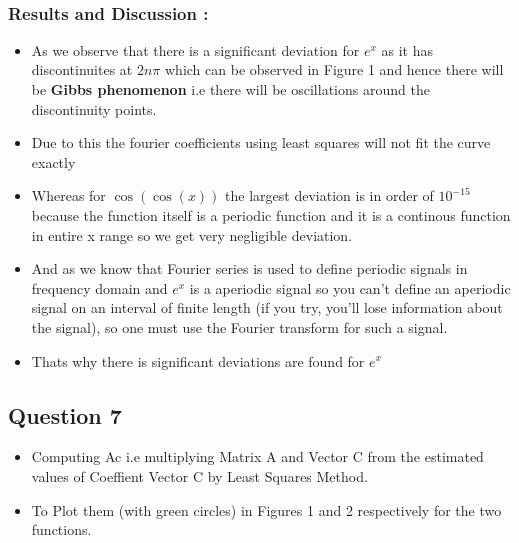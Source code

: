 \documentclass[a4paper]{article}
\providecommand{\tightlist}{%
      \setlength{\itemsep}{0pt}\setlength{\parskip}{0pt}}
\begin{document}
    \begin{center}
    \end{center}
    { \hspace*{\fill} \\}
    
    \subsubsection{Results and Discussion :}\label{results-and-discussion}

\begin{itemize}
\tightlist
\item
  As we observe that there is a significant deviation for \(e^{x}\) as
  it has discontinuites at \(2n\pi\) which can be observed in Figure 1
  and hence there will be \textbf{Gibbs phenomenon} i.e there will be
  oscillations around the discontinuity points.
\item
  Due to this the fourier coefficients using least squares will not fit
  the curve exactly
\item
  Whereas for \(\cos(\cos(x))\) the largest deviation is in order of
  \(10^{-15}\) because the function itself is a periodic function and it
  is a continous function in entire x range so we get very negligible
  deviation.
\item
  And as we know that Fourier series is used to define periodic signals
  in frequency domain and \(e^{x}\) is a aperiodic signal so you can't
  define an aperiodic signal on an interval of finite length (if you
  try, you'll lose information about the signal), so one must use the
  Fourier transform for such a signal.
\item
  Thats why there is significant deviations are found for \(e^{x}\)
\end{itemize}

    \subsection{Question 7}\label{question-7}

\begin{itemize}
\tightlist
\item
  Computing Ac i.e multiplying Matrix A and Vector C from the estimated
  values of Coeffient Vector C by Least Squares Method.
\item
  To Plot them (with green circles) in Figures 1 and 2 respectively for
  the two functions.
\end{itemize}
\end{document}
